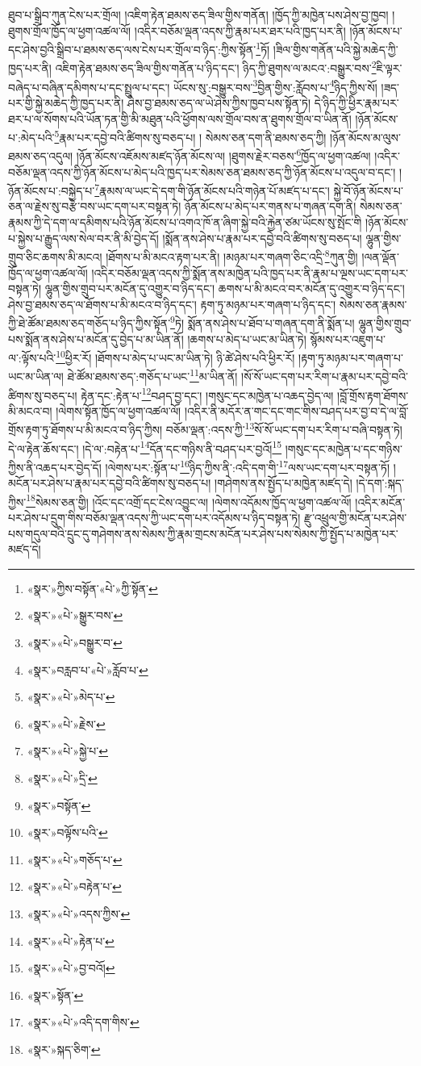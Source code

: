 ཐུབ་པ་སྒྲིབ་ཀུན་ངེས་པར་གྲོལ། །འཇིག་རྟེན་ཐམས་ཅད་ཟིལ་གྱིས་གནོན། །ཁྱོད་ཀྱི་མཁྱེན་པས་ཤེས་བྱ་ཁྱབ། །ཐུགས་གྲོལ་ཁྱོད་ལ་ཕྱག་འཚལ་ལོ། །འདིར་བཅོམ་ལྡན་འདས་ཀྱི་རྣམ་པར་ཐར་པའི་ཁྱད་པར་ནི། །ཉོན་མོངས་པ་དང་ཤེས་བྱའི་སྒྲིབ་པ་ཐམས་ཅད་ལས་ངེས་པར་གྲོལ་བ་ཉིད་:ཀྱིས་སྟོན་\footnote{«སྣར་»ཀྱིས་བསྟོན་«པེ་»ཀྱི་སྟོན་}ཏོ། །ཟིལ་གྱིས་གནོན་པའི་སྐྱེ་མཆེད་ཀྱི་ཁྱད་པར་ནི། འཇིག་རྟེན་ཐམས་ཅད་ཟིལ་གྱིས་གནོན་པ་ཉིད་དང་། ཉིད་ཀྱི་ཐུགས་ལ་མངའ་:བསྒྱུར་བས་\footnote{«སྣར་»«པེ་»སྒྱུར་བས་}ཇི་ལྟར་བཞེད་པ་བཞིན་དམིགས་པ་དང་སྤྲུལ་པ་དང་། ཡོངས་སུ་:བསྒྱུར་བས་\footnote{«སྣར་»«པེ་»བསྒྱུར་བ་}བྱིན་གྱིས་:རློབས་པ་\footnote{«སྣར་»བརླབ་པ་«པེ་»རློབ་པ་}ཉིད་ཀྱིས་སོ། །ཟད་པར་གྱི་སྐྱེ་མཆེད་ཀྱི་ཁྱད་པར་ནི། ཤེས་བྱ་ཐམས་ཅད་ལ་ཡེ་ཤེས་ཀྱིས་ཁྱབ་པས་སྟོན་ཏེ། དེ་ཉིད་ཀྱི་ཕྱིར་རྣམ་པར་ཐར་པ་ལ་སོགས་པའི་ཡོན་ཏན་གྱི་མི་མཐུན་པའི་ཕྱོགས་ལས་གྲོལ་བས་ན་ཐུགས་གྲོལ་བ་ཡིན་ནོ། །ཉོན་མོངས་པ་:མེད་པའི་\footnote{«སྣར་»«པེ་»མེད་པ་}རྣམ་པར་དབྱེ་བའི་ཚིགས་སུ་བཅད་པ། །
སེམས་ཅན་དག་ནི་ཐམས་ཅད་ཀྱི། །ཉོན་མོངས་མ་ལུས་ཐམས་ཅད་འདུལ། །ཉོན་མོངས་འཇོམས་མཛད་ཉོན་མོངས་ལ། །ཐུགས་རྗེར་བཅས་\footnote{«སྣར་»«པེ་»རྗེས་}ཁྱོད་ལ་ཕྱག་འཚལ། །འདིར་བཅོམ་ལྡན་འདས་ཀྱི་ཉོན་མོངས་པ་མེད་པའི་ཁྱད་པར་སེམས་ཅན་ཐམས་ཅད་ཀྱི་ཉོན་མོངས་པ་འདུལ་བ་དང་། །ཉོན་མོངས་པ་:བསྐྱེད་པ་\footnote{«སྣར་»«པེ་»སྐྱེ་པ་}རྣམས་ལ་ཡང་དེ་དག་གི་ཉོན་མོངས་པའི་གཉེན་པོ་མཛད་པ་དང་། སྐྱེ་བོ་ཉོན་མོངས་པ་ཅན་ལ་རྗེས་སུ་བརྩེ་བས་ཡང་དག་པར་བསྟན་ཏེ། ཉོན་མོངས་པ་མེད་པར་གནས་པ་གཞན་དག་ནི། སེམས་ཅན་རྣམས་ཀྱི་དེ་དག་ལ་དམིགས་པའི་ཉོན་མོངས་པ་འགའ་ཁོ་ན་ཞིག་སྐྱེ་བའི་རྐྱེན་ཙམ་ཡོངས་སུ་སྤོང་གི །ཉོན་མོངས་པ་སྐྱེས་པ་རྒྱུད་ལས་སེལ་བར་ནི་མི་བྱེད་དོ། །སྨོན་ནས་ཤེས་པ་རྣམ་པར་དབྱེ་བའི་ཚིགས་སུ་བཅད་པ། ལྷུན་གྱིས་གྲུབ་ཅིང་ཆགས་མི་མངའ། །ཐོགས་པ་མི་མངའ་རྟག་པར་ནི། །མཉམ་པར་གཞག་ཅིང་འདྲི་\footnote{«སྣར་»«པེ་»དྲི་}ཀུན་གྱི། །ལན་ལྡོན་ཁྱོད་ལ་ཕྱག་འཚལ་ལོ། །འདིར་བཅོམ་ལྡན་འདས་ཀྱི་སྨོན་ནས་མཁྱེན་པའི་ཁྱད་པར་ནི་རྣམ་པ་ལྔས་ཡང་དག་པར་བསྟན་ཏེ། ལྷུན་གྱིས་གྲུབ་པར་མངོན་དུ་འགྱུར་བ་ཉིད་དང་། ཆགས་པ་མི་མངའ་བར་མངོན་དུ་འགྱུར་བ་ཉིད་དང་། ཤེས་བྱ་ཐམས་ཅད་ལ་ཐོགས་པ་མི་མངའ་བ་ཉིད་དང་། རྟག་ཏུ་མཉམ་པར་གཞག་པ་ཉིད་དང་། སེམས་ཅན་རྣམས་ཀྱི་ཐེ་ཚོམ་ཐམས་ཅད་གཅོད་པ་ཉིད་ཀྱིས་སྟོན་\footnote{«སྣར་»བསྟོན་}ཏེ། སྨོན་ནས་ཤེས་པ་ཐོབ་པ་གཞན་དག་ནི་སྨོན་པ། ལྷུན་གྱིས་གྲུབ་པས་སྨོན་ནས་ཤེས་པ་མངོན་དུ་བྱེད་པ་མ་ཡིན་ནོ། །ཆགས་པ་མེད་པ་ཡང་མ་ཡིན་ཏེ། སྙོམས་པར་འཇུག་པ་ལ་:ལྟོས་པའི་\footnote{«སྣར་»བལྟོས་པའི་}ཕྱིར་རོ། །ཐོགས་པ་མེད་པ་ཡང་མ་ཡིན་ཏེ། ཉི་ཚེ་ཤེས་པའི་ཕྱིར་རོ། །རྟག་ཏུ་མཉམ་པར་གཞག་པ་ཡང་མ་ཡིན་ལ། ཐེ་ཚོམ་ཐམས་ཅད་:གཅོད་པ་ཡང་\footnote{«སྣར་»«པེ་»གཅོད་པ་}མ་ཡིན་ནོ། །སོ་སོ་ཡང་དག་པར་རིག་པ་རྣམ་པར་དབྱེ་བའི་ཚིགས་སུ་བཅད་པ། རྟེན་དང་:རྟེན་པ་\footnote{«སྣར་»«པེ་»བརྟེན་པ་}བཤད་བྱ་དང་། །གསུང་དང་མཁྱེན་པ་འཆད་བྱེད་ལ། །བློ་གྲོས་རྟག་ཐོགས་མི་མངའ་བ། །ལེགས་སྟོན་ཁྱོད་ལ་ཕྱག་འཚལ་ལོ། །འདིར་ནི་མདོར་ན་གང་དང་གང་གིས་བཤད་པར་བྱ་བ་དེ་ལ་བློ་གྲོས་རྟག་ཏུ་ཐོགས་པ་མི་མངའ་བ་ཉིད་ཀྱིས། བཅོམ་ལྡན་:འདས་ཀྱི་\footnote{«སྣར་»«པེ་»འདས་ཀྱིས་}སོ་སོ་ཡང་དག་པར་རིག་པ་བཞི་བསྟན་ཏེ། དེ་ལ་རྟེན་ཆོས་དང་། །དེ་ལ་:བརྟེན་པ་\footnote{«སྣར་»«པེ་»རྟེན་པ་}དོན་དང་གཉིས་ནི་བཤད་པར་བྱའོ།\footnote{«སྣར་»«པེ་»བྱ་བའོ།} །གསུང་དང་མཁྱེན་པ་དང་གཉིས་ཀྱིས་ནི་འཆད་པར་བྱེད་དོ། །ལེགས་པར་:སྟོན་པ་\footnote{«སྣར་»སྟོན་}ཉིད་ཀྱིས་ནི་:འདི་དག་གི་\footnote{«སྣར་»«པེ་»འདི་དག་གིས་}ལས་ཡང་དག་པར་བསྟན་ཏོ། །མངོན་པར་ཤེས་པ་རྣམ་པར་དབྱེ་བའི་ཚིགས་སུ་བཅད་པ། །གཤེགས་ནས་སྤྱོད་པ་མཁྱེན་མཛད་དེ། །དེ་དག་:སྐད་ཀྱིས་\footnote{«སྣར་»སྐད་ཅིག་}སེམས་ཅན་གྱི། །འོང་དང་འགྲོ་དང་ངེས་འབྱུང་ལ། །ལེགས་འདོམས་ཁྱོད་ལ་ཕྱག་འཚལ་ལོ། །འདིར་མངོན་པར་ཤེས་པ་དྲུག་གིས་བཅོམ་ལྡན་འདས་ཀྱི་ཡང་དག་པར་འདོམས་པ་ཉིད་བསྟན་ཏེ། རྫུ་འཕྲུལ་གྱི་མངོན་པར་ཤེས་པས་གདུལ་བའི་དྲུང་དུ་གཤེགས་ནས་སེམས་ཀྱི་རྣམ་གྲངས་མངོན་པར་ཤེས་པས་སེམས་ཀྱི་སྤྱོད་པ་མཁྱེན་པར་མཛད་དེ། 